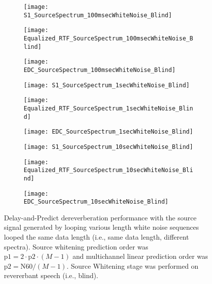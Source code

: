 \begin{figure}[H]
	\centering
	\begin{subfigure}[b]{0.3\textwidth}
		\centering
		\texttt{[image: S1\_SourceSpectrum\_100msecWhiteNoise\_Blind]}
	\end{subfigure}
	\begin{subfigure}[b]{0.3\textwidth}
		\centering
		\texttt{[image: Equalized\_RTF\_SourceSpectrum\_100msecWhiteNoise\_Blind]}
	\end{subfigure}
	\begin{subfigure}[b]{0.3\textwidth}
		\centering
		\texttt{[image: EDC\_SourceSpectrum\_100msecWhiteNoise\_Blind]}
	\end{subfigure}
	\begin{subfigure}[b]{0.3\textwidth}
		\centering
		\texttt{[image: S1\_SourceSpectrum\_1secWhiteNoise\_Blind]}
	\end{subfigure}
	\begin{subfigure}[b]{0.3\textwidth}
		\centering
		\texttt{[image: Equalized\_RTF\_SourceSpectrum\_1secWhiteNoise\_Blind]}
	\end{subfigure}
	\begin{subfigure}[b]{0.3\textwidth}
		\centering
		\texttt{[image: EDC\_SourceSpectrum\_1secWhiteNoise\_Blind]}
	\end{subfigure}
	\begin{subfigure}[b]{0.3\textwidth}
		\centering
		\texttt{[image: S1\_SourceSpectrum\_10secWhiteNoise\_Blind]}
	\end{subfigure}
	\begin{subfigure}[b]{0.3\textwidth}
		\centering
		\texttt{[image: Equalized\_RTF\_SourceSpectrum\_10secWhiteNoise\_Blind]}
	\end{subfigure}
	\begin{subfigure}[b]{0.3\textwidth}
		\centering
		\texttt{[image: EDC\_SourceSpectrum\_10secWhiteNoise\_Blind]}
	\end{subfigure}
	\caption{Delay-and-Predict dereverberation performance with the source signal generated by looping various length white noise sequences looped the same data length (i.e., same data length, different spectra). Source whitening prediction order was $\mathrm{p1} = 2 \cdot \mathrm{p2} \cdot (M-1)$ and multichannel linear prediction order was $\mathrm{p2} = \mathrm{N60} / (M-1)$. Source Whitening stage was performed on revererbant speech (i.e., blind).}
	\label{fig:params_source_spectrum_compare}
\end{figure}


